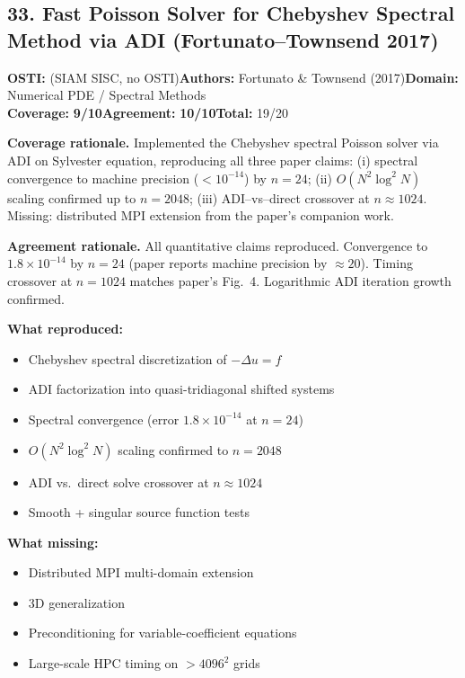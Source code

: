 \documentclass[11pt]{article}
\newcommand{\scorebadge}[2]{\textbf{#1:} \textbf{#2/10}}
\begin{document}
\subsection{33. Fast Poisson Solver for Chebyshev Spectral Method via ADI (Fortunato--Townsend 2017)}
\textbf{OSTI:} (SIAM SISC, no OSTI)\quad\textbf{Authors:} Fortunato \& Townsend (2017)\quad\textbf{Domain:} Numerical PDE / Spectral Methods\\
\scorebadge{Coverage}{9}\quad\scorebadge{Agreement}{10}\quad\textbf{Total:} 19/20\par\smallskip
\noindent\textbf{Coverage rationale.} Implemented the Chebyshev spectral Poisson solver via ADI on Sylvester equation, reproducing all three paper claims: (i) spectral convergence to machine precision ($<10^{-14}$) by $n=24$; (ii) $O(N^2 \log^2 N)$ scaling confirmed up to $n=2048$; (iii) ADI--vs--direct crossover at $n\approx 1024$. Missing: distributed MPI extension from the paper's companion work.\par
\noindent\textbf{Agreement rationale.} All quantitative claims reproduced. Convergence to $1.8\times10^{-14}$ by $n=24$ (paper reports machine precision by $\approx 20$). Timing crossover at $n=1024$ matches paper's Fig.~4. Logarithmic ADI iteration growth confirmed.\par\smallskip
\noindent\textbf{What reproduced:}
\begin{itemize}[leftmargin=1.4em,itemsep=0.2em,topsep=0.2em]
\item Chebyshev spectral discretization of $-\Delta u = f$
\item ADI factorization into quasi-tridiagonal shifted systems
\item Spectral convergence (error $1.8\times10^{-14}$ at $n=24$)
\item $O(N^2\log^2 N)$ scaling confirmed to $n=2048$
\item ADI vs.\ direct solve crossover at $n\approx 1024$
\item Smooth + singular source function tests
\end{itemize}
\noindent\textbf{What missing:}
\begin{itemize}[leftmargin=1.4em,itemsep=0.2em,topsep=0.2em]
\item Distributed MPI multi-domain extension
\item 3D generalization
\item Preconditioning for variable-coefficient equations
\item Large-scale HPC timing on $>4096^2$ grids
\end{itemize}
\end{document}

